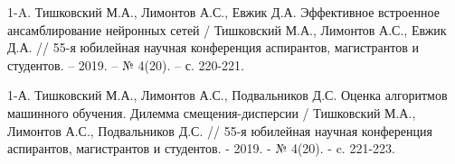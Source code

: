 
1-A. Тишковский М.А., Лимонтов А.С., Евжик Д.А. Эффективное встроенное ансамблирование нейронных сетей / Тишковский М.А., Лимонтов А.С., Евжик Д.А. // 55-я юбилейная научная конференция аспирантов, магистрантов и студентов. – 2019. – № 4(20). – с. 220-221.

1-А. Тишковский М.А., Лимонтов А.С., Подвальников Д.С. Оценка алгоритмов машинного обучения. Дилемма смещения-дисперсии / Тишковский М.А., Лимонтов А.С., Подвальников Д.С. // 55-я юбилейная научная конференция аспирантов, магистрантов и студентов. - 2019. - № 4(20). - c. 221-223.
